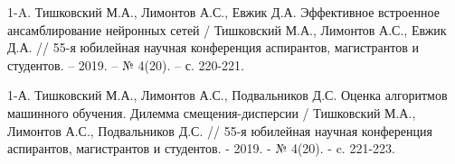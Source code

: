 
1-A. Тишковский М.А., Лимонтов А.С., Евжик Д.А. Эффективное встроенное ансамблирование нейронных сетей / Тишковский М.А., Лимонтов А.С., Евжик Д.А. // 55-я юбилейная научная конференция аспирантов, магистрантов и студентов. – 2019. – № 4(20). – с. 220-221.

1-А. Тишковский М.А., Лимонтов А.С., Подвальников Д.С. Оценка алгоритмов машинного обучения. Дилемма смещения-дисперсии / Тишковский М.А., Лимонтов А.С., Подвальников Д.С. // 55-я юбилейная научная конференция аспирантов, магистрантов и студентов. - 2019. - № 4(20). - c. 221-223.
